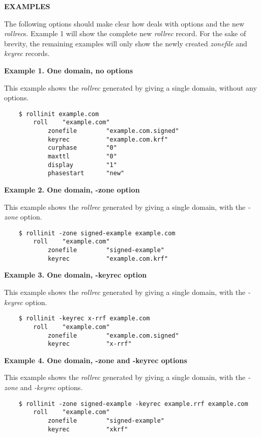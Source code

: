 {\bf EXAMPLES}

The following options should make clear how  deals with
options and the new {\it rollrec}s.  Example 1 will show the complete new
{\it rollrec} record.  For the sake of brevity, the remaining examples
will only show the newly created {\it zonefile} and {\it keyrec} records.

{\bf Example 1.  One domain, no options}

This example shows the {\it rollrec} generated by giving  a
single domain, without any options.

\begin{verbatim}
    $ rollinit example.com
        roll    "example.com"
            zonefile        "example.com.signed"
            keyrec          "example.com.krf"
            curphase        "0"
            maxttl          "0"
            display         "1"
            phasestart      "new"
\end{verbatim}

{\bf Example 2.  One domain, -zone option}

This example shows the {\it rollrec} generated by giving  a
single domain, with the {\it -zone} option.

\begin{verbatim}
    $ rollinit -zone signed-example example.com
        roll    "example.com"
            zonefile        "signed-example"
            keyrec          "example.com.krf"
\end{verbatim}

{\bf Example 3.  One domain, -keyrec option}

This example shows the {\it rollrec} generated by giving  a
single domain, with the {\it -keyrec} option.

\begin{verbatim}
    $ rollinit -keyrec x-rrf example.com
        roll    "example.com"
            zonefile        "example.com.signed"
            keyrec          "x-rrf"
\end{verbatim}

{\bf Example 4.  One domain, -zone and -keyrec options}

This example shows the {\it rollrec} generated by giving  a
single domain, with the {\it -zone} and {\it -keyrec} options.

\begin{verbatim}
    $ rollinit -zone signed-example -keyrec example.rrf example.com
        roll    "example.com"
            zonefile        "signed-example"
            keyrec          "xkrf"
\end{verbatim}

